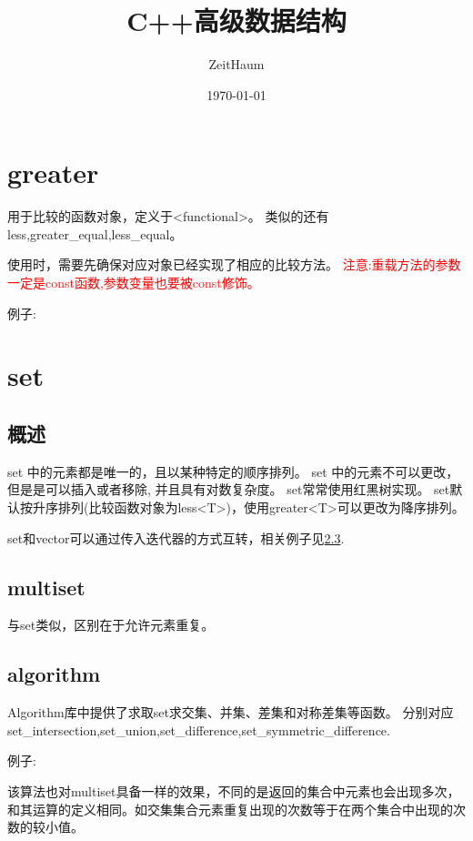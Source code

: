 \documentclass{article}
\author{ZeitHaum}
\date{\today}
\title{C++高级数据结构}
\begin{document}
    \maketitle
    \newpage 
    \tableofcontents
    \newpage
    \setcounter{page}{1}
    \section{greater}
    用于比较的函数对象，定义于<functional>。
    类似的还有less,greater\_equal,less\_equal。

    使用时，需要先确保对应对象已经实现了相应的比较方法。
    \textcolor{red}{注意:重载方法的参数一定是const函数,参数变量也要被const修饰。}
    
    例子:
    


    
    \section{set}
    \subsection{概述}
    set 中的元素都是唯一的，且以某种特定的顺序排列。
    set 中的元素不可以更改，但是是可以插入或者移除, 并且具有对数复杂度。
    set常常使用红黑树实现。
    set默认按升序排列(比较函数对象为less<T>)，使用greater<T>可以更改为降序排列。

    set和vector可以通过传入迭代器的方式互转，相关例子见\ref{set-algorithm}.

    \subsection{multiset}
    与set类似，区别在于允许元素重复。

    \subsection{algorithm}\label{set-algorithm}
    Algorithm库中提供了求取set求交集、并集、差集和对称差集等函数。
    分别对应set\_intersection,set\_union,set\_difference,set\_symmetric\_difference.

    例子:

    

    该算法也对multiset具备一样的效果，不同的是返回的集合中元素也会出现多次，和其运算的定义相同。如交集集合元素重复出现的次数等于在两个集合中出现的次数的较小值。
\end{document}
